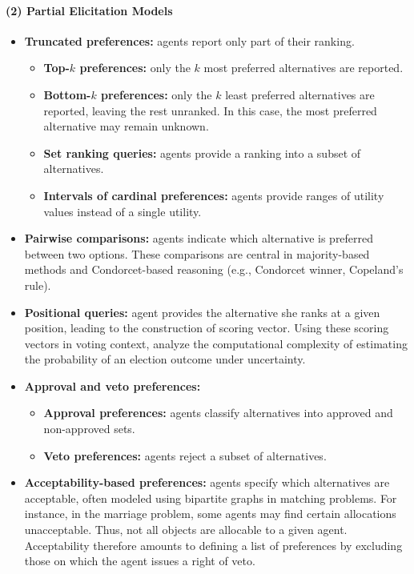 \documentclass{article}
\begin{document}
\paragraph{(2) Partial Elicitation Models}

\begin{itemize}
    \item \textbf{Truncated preferences:} agents report only part of their ranking.
    \begin{itemize}
        \item \textbf{Top-$k$ preferences:} only the $k$ most preferred alternatives are reported.
        \item \textbf{Bottom-$k$ preferences:} only the $k$ least preferred alternatives are reported, leaving the rest unranked. In this case, the most preferred alternative may remain unknown.
        \item \textbf{Set ranking queries:} agents provide a ranking into a subset of alternatives.
        \item \textbf{Intervals of cardinal preferences:} agents provide ranges of utility values instead of a single utility.
    \end{itemize}
    
    \item \textbf{Pairwise comparisons:} agents indicate which alternative is preferred between two options. These comparisons are central in majority-based methods and Condorcet-based reasoning (e.g., Condorcet winner, Copeland's rule).

    \item \textbf{Positional queries:} agent provides the alternative she ranks at a given position, leading to the construction of scoring vector. Using these scoring vectors in voting context, \cite{kenig2019approximate} analyze the computational complexity of estimating the probability of an election outcome under uncertainty.

    \item \textbf{Approval and veto preferences:}
    \begin{itemize}
        \item \textbf{Approval preferences:} agents classify alternatives into approved and non-approved sets.
        \item \textbf{Veto preferences:} agents reject a subset of alternatives.
    \end{itemize}

    \item \textbf{Acceptability-based preferences:} agents specify which alternatives are acceptable, often modeled using bipartite graphs in matching problems. For instance, in the marriage problem, some agents may find certain allocations unacceptable. Thus, not all objects are allocable to a given agent. Acceptability therefore amounts to defining a list of preferences by excluding those on which the agent issues a right of veto.


\end{itemize}
\end{document}
